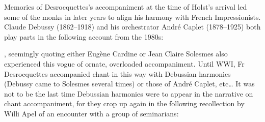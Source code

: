 Memories of Desrocquettes's accompaniment at the time of Holst's arrival led some of the monks in later years to align his harmony with French Impressionists.
Claude Debussy (1862--1918) and his orchestrator André Caplet (1878--1925) both play parts in the following account from the 1980s:

  {\cite[399]{Pinguetecolesmusiquedivine1987}, seemingly quoting either Eugène Cardine or Jean Claire}
{Solesmes also experienced this vogue of ornate, overloaded accompaniment. Until WWI, Fr Desrocquettes accompanied chant in this way with Debussian harmonies (Debussy came to Solesmes several times) or those of André Caplet, etc\ldots{}}
\noindent
It was not to be the last time Debussian harmonies were to appear in the narrative on chant accompaniment, for they crop up again in the following recollection by Willi Apel of an encounter with a group of seminarians:
\pagebreak{}

